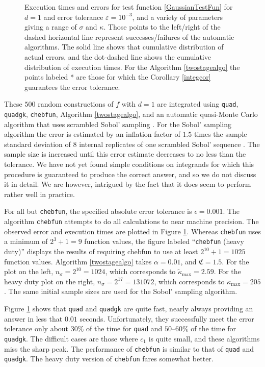 \documentclass[graybox]{svmult}
\newcommand{\fudge}{\mathfrak{C}}
\newcommand{\tkappa}{\tilde{\kappa}}
\begin{document}
\begin{figure}
\caption{Execution times and errors for test function \eqref{GaussianTestFun} for $d=1$ and error tolerance $\varepsilon=10^{-3}$, and a variety of parameters giving a range of $\sigma$ and $\kappa$. Those points to the left/right of the dashed horizontal line represent successes/failures of the automatic algorithms.  The solid line shows that cumulative distribution of actual errors, and the dot-dashed line shows the cumulative distribution of execution times.  For the Algorithm \ref{twostagealgo} the points labeled * are those for which the Corollary \ref{integcor} guarantees the error tolerance.\label{GaussianTestFunFig} }
\end{figure}

These $500$ random constructions of $f$ with $d=1$ are integrated using {\tt quad},  {\tt quadgk}, {\tt chebfun}, Algorithm \ref{twostagealgo}, and an automatic quasi-Monte Carlo algorithm that uses scrambled Sobol' sampling \citep{Owe95,Owe96,Owe97,Mat98,HonHic00a,DicPil10a}.  For the Sobol' sampling algorithm the error is estimated by an inflation factor of $1.5$ times the sample standard deviation of $8$ internal replicates of one scrambled Sobol' sequence \citep{Owe06a}.  The sample size is increased until this error estimate decreases to no less than the tolerance.  We have not yet found simple conditions on integrands for which this procedure is guaranteed to produce the correct answer, and so we do not discuss it in detail.  We are however, intrigued by the fact that it does seem to perform rather well in practice.

For all but {\tt chebfun}, the specified absolute error tolerance is $\epsilon=0.001$.  The algorithm {\tt chebfun} attempts to do all calculations to near machine precision.  The observed error and execution times are plotted in Figure \ref{GaussianTestFunFig}.  Whereas {\tt chebfun} uses a minimum of $2^3+1=9$ function values, the figure labeled ``{\tt chebfun} (heavy duty)'' displays the results of requiring chebfun to use at least $2^{10}+1=1025$ function values.  Algorithm \ref{twostagealgo} takes $\alpha=0.01$, and $\fudge=1.5$.  For the plot on the left, $n_\sigma=2^{10}=1024$, which corresponds to  $\tkappa_{\max}=2.59$.  For the heavy duty plot on the right, $n_\sigma=2^{17}=131072$, which corresponds to  $\kappa_{\max}=205$.  The same initial sample sizes are used for the Sobol' sampling algorithm.

Figure \ref{GaussianTestFunFig} shows that {\tt quad} and {\tt quadgk} are quite fast, nearly always providing an answer in less that $0.01$ seconds.  Unfortunately, they successfully meet the error tolerance only about $30\%$ of the time for {\tt quad} and $50$--$60\%$ of the time for {\tt quadgk}.  The difficult cases are those where $c_1$ is quite small, and these algorithms miss the sharp peak.  The performance of {\tt chebfun} is similar to that of {\tt quad} and {\tt quadgk}.  The heavy duty version of  {\tt chebfun} fares somewhat better.  
\end{document}
